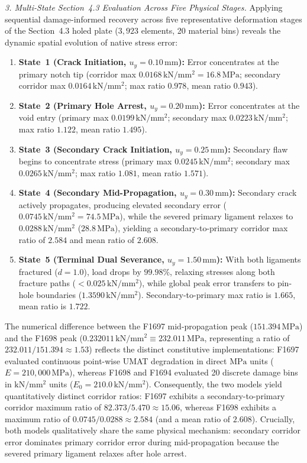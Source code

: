 \textit{3. Multi-State Section~4.3 Evaluation Across Five Physical Stages.}
Applying sequential damage-informed recovery across five representative deformation stages of the Section~4.3 holed plate ($3{,}923$ elements, 20 material bins) reveals the dynamic spatial evolution of native stress error:
\begin{enumerate}
  \item \textbf{State~1 (Crack Initiation, $u_y = 0.10\,\mathrm{mm}$):} Error concentrates at the primary notch tip (corridor max $0.0168\,\mathrm{kN/mm^2} = 16.8\,\mathrm{MPa}$; secondary corridor max $0.0164\,\mathrm{kN/mm^2}$; max ratio $0.978$, mean ratio $0.943$).
  \item \textbf{State~2 (Primary Hole Arrest, $u_y = 0.20\,\mathrm{mm}$):} Error concentrates at the void entry (primary max $0.0199\,\mathrm{kN/mm^2}$; secondary max $0.0223\,\mathrm{kN/mm^2}$; max ratio $1.122$, mean ratio $1.495$).
  \item \textbf{State~3 (Secondary Crack Initiation, $u_y = 0.25\,\mathrm{mm}$):} Secondary flaw begins to concentrate stress (primary max $0.0245\,\mathrm{kN/mm^2}$; secondary max $0.0265\,\mathrm{kN/mm^2}$; max ratio $1.081$, mean ratio $1.571$).
  \item \textbf{State~4 (Secondary Mid-Propagation, $u_y = 0.30\,\mathrm{mm}$):} Secondary crack actively propagates, producing elevated secondary error ($0.0745\,\mathrm{kN/mm^2} = 74.5\,\mathrm{MPa}$), while the severed primary ligament relaxes to $0.0288\,\mathrm{kN/mm^2}$ ($28.8\,\mathrm{MPa}$), yielding a secondary-to-primary corridor max ratio of $2.584$ and mean ratio of $2.608$.
  \item \textbf{State~5 (Terminal Dual Severance, $u_y = 1.50\,\mathrm{mm}$):} With both ligaments fractured ($d=1.0$), load drops by $99.98\%$, relaxing stresses along both fracture paths ($< 0.025\,\mathrm{kN/mm^2}$), while global peak error transfers to pin-hole boundaries ($1.3590\,\mathrm{kN/mm^2}$). Secondary-to-primary max ratio is $1.665$, mean ratio is $1.722$.
\end{enumerate}
The numerical difference between the F1697 mid-propagation peak ($151.394\,\mathrm{MPa}$) and the F1698 peak ($0.232011\,\mathrm{kN/mm^2} \equiv 232.011\,\mathrm{MPa}$, representing a ratio of $232.011 / 151.394 \approx 1.53$) reflects the distinct constitutive implementations: F1697 evaluated continuous point-wise UMAT degradation in direct $\mathrm{MPa}$ units ($E = 210{,}000\,\mathrm{MPa}$), whereas F1698 and F1694 evaluated 20 discrete damage bins in $\mathrm{kN/mm^2}$ units ($E_0 = 210.0\,\mathrm{kN/mm^2}$). Consequently, the two models yield quantitatively distinct corridor ratios: F1697 exhibits a secondary-to-primary corridor maximum ratio of $82.373 / 5.470 \approx 15.06$, whereas F1698 exhibits a maximum ratio of $0.0745 / 0.0288 \approx 2.584$ (and a mean ratio of $2.608$). Crucially, both models qualitatively share the same physical mechanism: secondary corridor error dominates primary corridor error during mid-propagation because the severed primary ligament relaxes after hole arrest.
